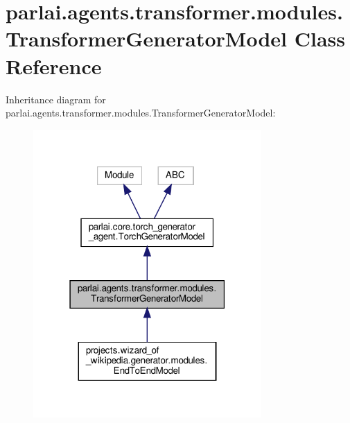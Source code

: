 \hypertarget{classparlai_1_1agents_1_1transformer_1_1modules_1_1TransformerGeneratorModel}{}\section{parlai.\+agents.\+transformer.\+modules.\+Transformer\+Generator\+Model Class Reference}
\label{classparlai_1_1agents_1_1transformer_1_1modules_1_1TransformerGeneratorModel}


Inheritance diagram for parlai.\+agents.\+transformer.\+modules.\+Transformer\+Generator\+Model\+:
\nopagebreak
\begin{figure}[H]
\begin{center}
\leavevmode
\includegraphics[width=247pt]{d8/dbb/classparlai_1_1agents_1_1transformer_1_1modules_1_1TransformerGeneratorModel__inherit__graph}
\end{center}
\end{figure}


